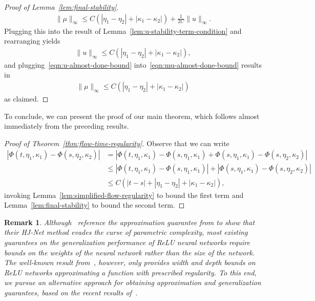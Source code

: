 \documentclass[11pt,reqno]{amsart}
\numberwithin{equation}{section}
\theoremstyle{plain}
\newtheorem{remark}{Remark}[section]
\newcommand{\1}{\boldsymbol{\mathbbm{1}}}
\begin{document}
\begin{proof}[Proof of Lemma~\ref{lem:final-stability}]
\begin{align}
\label{eqn:mu-almost-done-bound}
    \|\mu\|_\infty \leq C(|\eta_1 - \eta_2| + |\kappa_1 - \kappa_2|) + \frac{1}{2C}\|u\|_\infty.
\end{align}
Plugging this into the result of Lemma~\ref{lem:u-stability-term-condition} and rearranging yields
\begin{align}
\label{eqn:u-almost-done-bound}
    \|u\|_\infty \leq C(|\eta_1 - \eta_2| + |\kappa_1 - \kappa_2|),
\end{align}
and plugging~\eqref{eqn:u-almost-done-bound} into~\eqref{eqn:mu-almost-done-bound} results in
\begin{align*}
    \|\mu\|_\infty \leq C(|\eta_1 - \eta_2| + |\kappa_1 - \kappa_2|)
\end{align*}
as claimed.
\end{proof}
To conclude, we can present the proof of our main theorem, which follows almost immediately from the preceding results.
\begin{proof}[Proof of Theorem~\ref{thm:flow-time-regularity}]
Observe that we can write
\begin{align*}
    |\Phi(t, \eta_1, \kappa_1) - \Phi(s, \eta_2, \kappa_2)| &= |\Phi(t, \eta_1, \kappa_1) - \Phi(s, \eta_1, \kappa_1) + \Phi(s, \eta_1, \kappa_1) - \Phi(s, \eta_2, \kappa_2)| \\
    &\leq |\Phi(t, \eta_1, \kappa_1) - \Phi(s, \eta_1, \kappa_1)| + |\Phi(s, \eta_1, \kappa_1) - \Phi(s, \eta_2, \kappa_2)| \\
    &\leq C(|t - s| + |\eta_1 - \eta_2| + |\kappa_1 - \kappa_2|),
\end{align*}
invoking Lemma~\ref{lem:simplified-flow-regularity} to bound the first term and Lemma~\ref{lem:final-stability} to bound the second term.
\end{proof}


\begin{remark}\label{rem:references-theory}
    Although~\cite{Lanthaler2025} reference the approximation guarantee from \cite[Theorem 1]{Yarotsky2017} to show that their HJ-Net method evades the curse of parametric complexity, most existing guarantees on the generalization performance of ReLU neural networks require bounds on the \textit{weights} of the neural network rather than the size of the network. The well-known result from~\cite{Yarotsky2017}, however, only provides width and depth bounds on ReLU networks approximating a function with prescribed regularity. To this end, we pursue an alternative approach for obtaining approximation and generalization guarantees, based on the recent results of~\cite{Jiao2023}.
\end{remark}
\end{document}
